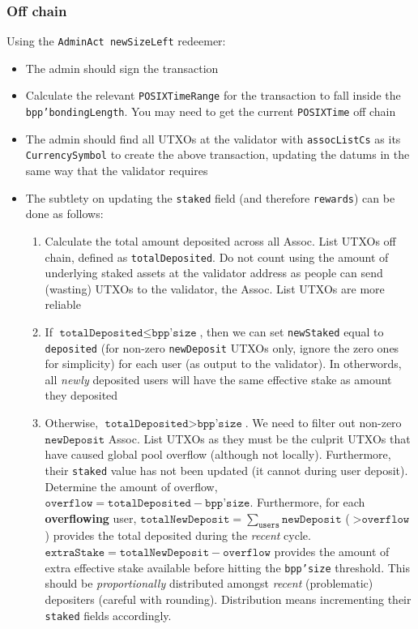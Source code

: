 \documentclass[10pt, a4paper]{article}
\theoremstyle{definition}
\begin{document}
\subsubsection{Off chain}
Using the \texttt{AdminAct newSizeLeft} redeemer:
\begin{itemize}
\item{The admin should sign the transaction}
\item{Calculate the relevant \texttt{POSIXTimeRange} for the transaction to fall inside the \texttt{bpp'bondingLength}. You may need to get the current \texttt{POSIXTime} off chain}
\item{The admin should find all UTXOs at the validator with \texttt{assocListCs} as its \texttt{CurrencySymbol} to create the above transaction, updating the datums in the same way that the validator requires}
\item{The subtlety on updating the \texttt{staked} field (and therefore \texttt{rewards}) can be done as follows:
\begin{enumerate}
\item{Calculate the total amount deposited across all Assoc. List UTXOs off chain, defined as \texttt{totalDeposited}. Do not count using the amount of underlying staked assets at the validator address as people can send (wasting) UTXOs to the validator, the Assoc. List UTXOs are more reliable}
\item{If $\texttt{totalDeposited} \leq \texttt{bpp'size}$, then we can set \texttt{newStaked} equal to \texttt{deposited} (for non-zero \texttt{newDeposit} UTXOs only, ignore the zero ones for simplicity) for each user (as output to the validator). In otherwords, all \textit{newly} deposited users will have the same effective stake as amount they deposited}
\item{Otherwise, $\texttt{totalDeposited} > \texttt{bpp'size}$. We need to filter out non-zero $\texttt{newDeposit}$ Assoc. List UTXOs as they must be the culprit UTXOs that have caused global pool overflow (although not locally). Furthermore, their \texttt{staked} value has not been updated (it cannot during user deposit). Determine the amount of overflow, $\texttt{overflow}=\texttt{totalDeposited} - \texttt{bpp'size}$. Furthermore, for each \textbf{overflowing} user, $\texttt{totalNewDeposit} = \sum_\texttt{users}\texttt{newDeposit}$ ($> \texttt{overflow}$) provides the total deposited during the \textit{recent} cycle. $\texttt{extraStake} = \texttt{totalNewDeposit} - \texttt{overflow}$ provides the amount of extra effective stake available before hitting the \texttt{bpp'size} threshold. This should be \textit{proportionally} distributed amongst \textit{recent} (problematic) depositers (careful with rounding). Distribution means incrementing their \texttt{staked} fields accordingly.
}
\end{enumerate}}
\end{itemize}
\end{document}
